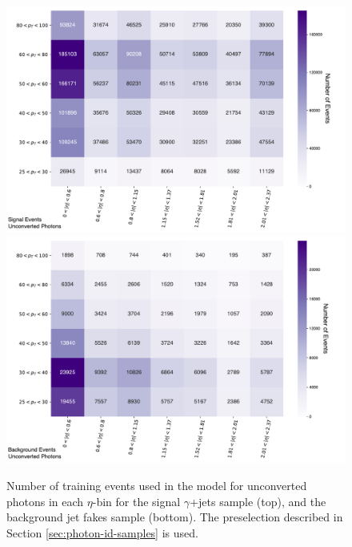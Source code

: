 \begin{figure}[!hp]
    \centering
    \includegraphics[width=.85\textwidth]{chapters/chapter4_photonID/images/sig_events.pdf}
    \includegraphics[width=.85\textwidth]{chapters/chapter4_photonID/images/bkg_events.pdf}
    \caption[Number of training events used in the model for unconverted photons in each $\eta$-\pt bin for the signal $\gamma$+jets sample, and the background jet fakes sample]{Number of training events used in the model for unconverted photons in each $\eta$-\pt bin for the signal $\gamma$+jets sample (top), and the background jet fakes sample (bottom). The preselection described in Section \ref{sec:photon-id-samples} is used.}
    \label{fig:photonid-events}
\end{figure}
